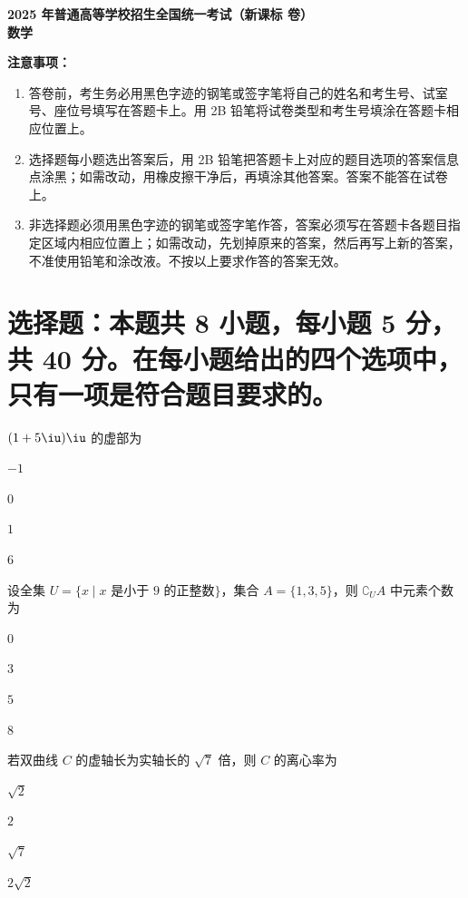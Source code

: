 \documentclass{exam-zh}
\begin{document}
\begin{center}
  {\bfseries 2025 年普通高等学校招生全国统一考试（新课标 \uppercase\expandafter{} 卷）}\\[4pt]
  {\bfseries 数\quad 学}
\end{center}

\noindent\textbf{注意事项：}
\begin{enumerate}
  \item 答卷前，考生务必用黑色字迹的钢笔或签字笔将自己的姓名和考生号、试室号、座位号填写在答题卡上。用 2B 铅笔将试卷类型和考生号填涂在答题卡相应位置上。
  \item 选择题每小题选出答案后，用 2B 铅笔把答题卡上对应的题目选项的答案信息点涂黑；如需改动，用橡皮擦干净后，再填涂其他答案。答案不能答在试卷上。
  \item 非选择题必须用黑色字迹的钢笔或签字笔作答，答案必须写在答题卡各题目指定区域内相应位置上；如需改动，先划掉原来的答案，然后再写上新的答案，不准使用铅笔和涂改液。不按以上要求作答的答案无效。
\end{enumerate}

\section{选择题：本题共 8 小题，每小题 5 分，共 40 分。在每小题给出的四个选项中，只有一项是符合题目要求的。}

\begin{question}
$(1+5\iu)\iu$ 的虚部为 \paren
\begin{choices}
  \item $-1$
  \item $0$
  \item $1$
  \item $6$
\end{choices}
\end{question}

\begin{question}
设全集 $U=\{x\mid x\text{ 是小于 }9\text{ 的正整数}\}$，集合 $A=\{1,3,5\}$，则 $\complement_{U}A$ 中元素个数为 \paren
\begin{choices}
  \item $0$
  \item $3$
  \item $5$
  \item $8$
\end{choices}
\end{question}

\begin{question}
若双曲线 $C$ 的虚轴长为实轴长的 $\sqrt{7}$ 倍，则 $C$ 的离心率为 \paren
\begin{choices}
  \item $\sqrt{2}$
  \item $2$
  \item $\sqrt{7}$
  \item $2\sqrt{2}$
\end{choices}
\end{question}
\end{document}
